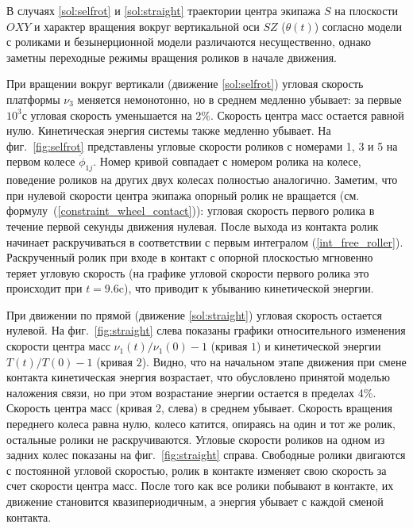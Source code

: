 В случаях \ref{sol:selfrot} и \ref{sol:straight} траектории центра экипажа $S$ на плоскости $OXY$ и характер вращения вокруг вертикальной оси $SZ$ ($\theta(t)$) согласно модели с роликами и безынерционной модели различаются несущественно, однако заметны переходные режимы вращения роликов в начале движения.

При вращении вокруг вертикали (движение \ref{sol:selfrot}) угловая скорость платформы $\nu_3$ меняется немонотонно, но в среднем медленно убывает: за первые $10^3$с угловая скорость уменьшается на 2\%. Скорость центра масс остается равной нулю. Кинетическая энергия системы также медленно убывает. На 
фиг.~\ref{fig:selfrot} представлены угловые скорости роликов с номерами 1, 3 и 5 на первом колесе $\dot{\phi}_{1j}$. Номер кривой совпадает с номером ролика на колесе, поведение роликов на других двух колесах полностью аналогично. Заметим, что при нулевой скорости центра экипажа опорный ролик не вращается (см. формулу~(\ref{constraint_wheel_contact})): угловая скорость первого ролика в течение первой секунды движения нулевая. После выхода из контакта ролик начинает раскручиваться в соответствии с первым интегралом (\ref{int_free_roller}). Раскрученный ролик при входе в контакт с опорной плоскостью мгновенно теряет угловую скорость (на графике угловой скорости первого ролика это происходит при $t=9.6$c), что приводит к убыванию кинетической энергии.

При движении по прямой (движение \ref{sol:straight}) угловая скорость остается нулевой.
На фиг.~\ref{fig:straight} слева показаны графики относительного изменения скорости центра масс $\nu_1(t)/\nu_1(0)-1$ (кривая $\textit{1}$) и кинетической энергии $T(t)/T(0)-1$ (кривая $\textit{2}$). Видно, что на начальном этапе движения при смене контакта кинетическая энергия возрастает, что обусловлено принятой моделью наложения связи, но при этом возрастание энергии остается в пределах 4\%. Скорость центра масс (кривая $\textit{2}$, слева) в среднем убывает. Скорость вращения переднего колеса равна нулю, колесо катится, опираясь на один и тот же ролик, остальные ролики не раскручиваются. Угловые скорости роликов на одном из задних колес показаны на фиг.~\ref{fig:straight} справа. Свободные ролики двигаются с постоянной угловой скоростью, ролик в контакте изменяет свою скорость за счет скорости центра масс. После того как все ролики побывают в контакте, их движение становится квазипериодичным, а энергия убывает с каждой сменой контакта. 

